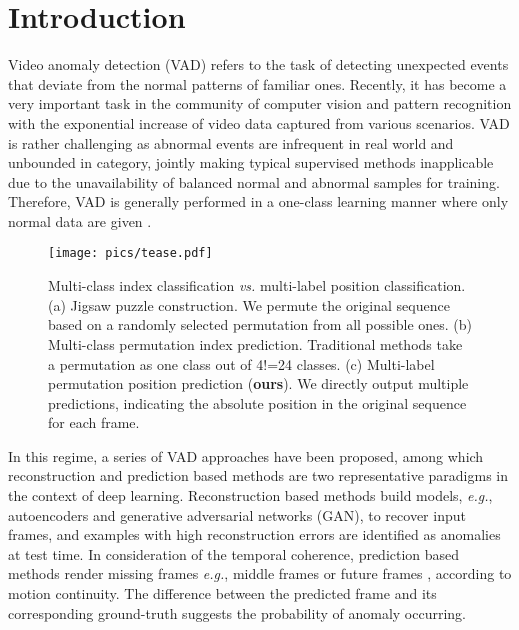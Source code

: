 \documentclass[runningheads]{llncs}
\begin{document}
\section{Introduction}


\label{sec:intro}


Video anomaly detection (VAD) refers to the task of detecting unexpected events that deviate from the normal patterns of familiar ones. Recently, it has become a very important task in the community of computer vision and pattern recognition with the exponential increase of video data captured from various scenarios. VAD is rather challenging as abnormal events are infrequent in real world and unbounded in category, jointly making typical supervised methods inapplicable due to the unavailability of balanced normal and abnormal samples for training. Therefore, VAD is generally performed in a one-class learning manner where only normal data are given \cite{liu2018future, liu2021hybrid, georgescu2021anomaly}. 


\begin{figure*}[!h]
	\centering
	\texttt{[image: pics/tease.pdf]}
	\caption{Multi-class index classification \emph{vs.} multi-label position classification. (a) Jigsaw puzzle construction. We permute the original sequence based on a randomly selected permutation from all possible ones. (b) Multi-class permutation index prediction. Traditional methods \cite{noroozi2016unsupervised, lee2017unsupervised, kim2019self} take a permutation as one class out of 4!=24 classes. (c) Multi-label permutation position prediction (\textbf{ours}). We directly output multiple predictions, indicating the absolute position in the original sequence for each frame.}
	\label{fig:tease}
\end{figure*}

In this regime, a series of VAD approaches \cite{liu2018future, feng2021Conv, luo2017remembering, gong2019memorizing, MM21, yu2020cloze, lee2019bman, nguyen2019anomaly} have been proposed, among which reconstruction and prediction based methods are two representative paradigms in the context of deep learning. Reconstruction based methods \cite{gong2019memorizing, nguyen2019anomaly} build models, \emph{e.g.}, autoencoders and generative adversarial networks (GAN), to recover input frames, and examples with high reconstruction errors are identified as anomalies at test time. In consideration of the temporal coherence, prediction based methods render missing frames \emph{e.g.}, middle frames \cite{yu2020cloze} or future frames \cite{liu2018future, feng2021Conv}, according to motion continuity. The difference between the predicted frame and its corresponding ground-truth suggests the probability of anomaly occurring.
\end{document}
